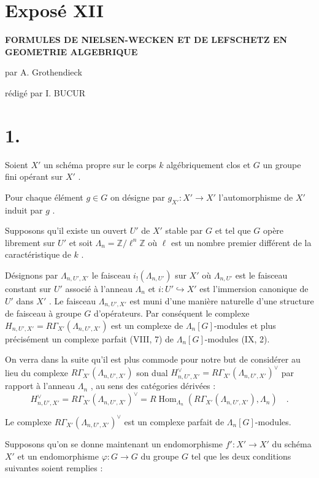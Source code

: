 \documentclass[11pt]{article}
\DeclareMathOperator{\Hom}{Hom}
\providecommand{\Hom}{\operatorname{Hom}}
\providecommand{\La}{\Lambda}
\providecommand{\bZ}{\mathbb Z}
\providecommand{\Hom}{\operatorname{Hom}}
\begin{document}
\section*{Exposé XII}

\begin{center}
\Large\bf FORMULES DE NIELSEN-WECKEN ET DE LEFSCHETZ EN GEOMETRIE ALGEBRIQUE
\end{center}

\begin{center}
par A. Grothendieck

rédigé par I. BUCUR
\end{center}

\bigskip

\section*{1.}
Soient $X'$ un schéma propre sur le corps $k$ algébriquement clos et $G$ un groupe fini opérant sur $X'$ .

Pour chaque élément $g \in G$ on désigne par $g_{X'} : X' \to X'$ l'automorphisme de $X'$ induit par $g$ .

Supposons qu'il existe un ouvert $U'$ de $X'$ stable par $G$ et tel que $G$ opère librement sur $U'$ et soit $\La_n = \bZ/\ell^n\bZ$ où $\ell$ est un nombre premier différent de la caractéristique de $k$ .

Désignons par $\La_{n,U',X'}$ le faisceau $i_!(\La_{n,U'})$ sur $X'$ où $\La_{n,U'}$ est le faisceau constant sur $U'$ associé à l'anneau $\La_n$ et $i : U' \hookrightarrow X'$ est l'immersion canonique de $U'$ dans $X'$ . Le faisceau $\La_{n,U',X'}$ est muni d'une manière naturelle d'une structure de faisceau à groupe $G$ d'opérateurs. Par conséquent le complexe $H_{n,U',X'} = R\Gamma_{X'}(\La_{n,U',X'})$ est un complexe de $\La_n[G]$-modules et plus précisément un complexe parfait (VIII, 7) de $\La_n[G]$-modules (IX, 2).

On verra dans la suite qu'il est plus commode pour notre but de considérer au lieu du complexe $R\Gamma_{X'}(\La_{n,U',X'})$ son dual $H_{n,U',X'}^\vee = R\Gamma_{X'}(\La_{n,U',X'})^\vee$ par rapport à l'anneau $\La_n$ , au sens des catégories dérivées :
\[
H_{n,U',X'}^\vee = R\Gamma_{X'}(\La_{n,U',X'})^\vee = R\Hom_{\La_n}(R\Gamma_{X'}(\La_{n,U',X'}), \La_n) \quad .
\]

Le complexe $R\Gamma_{X'}(\La_{n,U',X'})^\vee$ est un complexe parfait de $\La_n[G]$-modules.

Supposons qu'on se donne maintenant un endomorphisme $f' : X' \to X'$ du schéma $X'$ et un endomorphisme $\varphi : G \to G$ du groupe $G$ tel que les deux conditions suivantes soient remplies :
\end{document}
